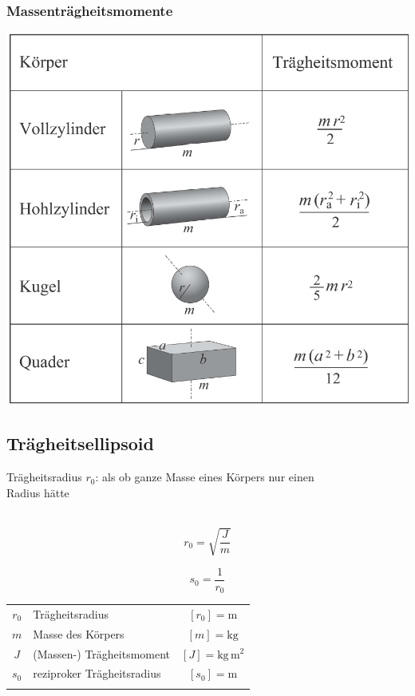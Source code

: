 		\subsubsection{Massenträgheitsmomente}
		
			\includegraphics[width=0.8\linewidth]{Bilder/massentraegheitsmomente}

	\subsection{Trägheitsellipsoid}
		Trägheitsradius $r_0$: als ob ganze Masse eines Körpers nur einen \\
		Radius hätte \\
		\\
		\begin{minipage}{0.48\linewidth}
			$$ \boxed{ r_0 = \sqrt{\frac{J}{m}}} $$
		\end{minipage}
		\hfill
		\begin{minipage}{0.48\linewidth}
			$$ \boxed{s_0 = \frac{1}{r_0} }$$
		\end{minipage}
		
		\begin{tabular}{c l c}
			$r_0$ & Trägheitsradius & $[r_0] = \mathrm{m}$ \\
			$m$ & Masse des Körpers & $[m] = \mathrm{kg}$ \\
			$J$ & (Massen-) Trägheitsmoment & $[J] = \mathrm{kg \, m^2}$ \\
			$s_0$ & reziproker Trägheitsradius & $[s_0] = \mathrm{m}$ \\
			\\
		\end{tabular}
		
